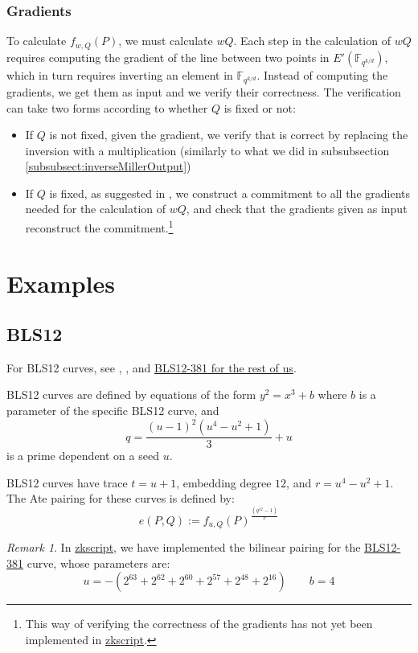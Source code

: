 \documentclass{article}
\newcommand{\fq}[1]{\mathbb{F}_{q^{#1}}}
\theoremstyle{remark}
\newtheorem{remark}{Remark}[section]
\theoremstyle{plain}
\begin{document}
\subsubsection{Gradients}

To calculate $f_{w,Q}(P)$, we must calculate $w Q$.
Each step in the calculation of $wQ$ requires computing the gradient of the line between two points in $E'(\fq{k/d})$, which in turn requires inverting an element in $\fq{k/d}$.
Instead of computing the gradients, we get them as input and we verify their correctness.
The verification can take two forms according to whether $Q$ is fixed or not:
\begin{itemize}
    \item If $Q$ is not fixed, given the gradient, we verify that is correct by replacing the inversion with a multiplication (similarly to what we did in subsubsection \ref{subsubsect:inverseMillerOutput})
    \item If $Q$ is fixed, as suggested in \cite{NE-on-proving-pairings}, we construct a commitment to all the gradients needed for the calculation of $wQ$, and check that the gradients given as input reconstruct the commitment.\footnote{This way of verifying the correctness of the gradients has not yet been implemented in \href{https://github.com/nchain-innovation/zkscript_package}{zkscript}.}
\end{itemize}

\section{Examples}

\subsection{BLS12}

For BLS12 curves, see \cite{BLS-curves-with-prescribed-emb-degree}, \cite{FST-taxonomy}, and \href{https://hackmd.io/@benjaminion/bls12-381}{BLS12-381 for the rest of us}.

BLS12 curves are defined by equations of the form $y^2 = x^3 + b$ where $b$ is a parameter of the specific BLS12 curve, and
\[
    q = \frac{(u-1)^2 (u^4 - u^2 + 1)}{3} + u
\]
is a prime dependent on a seed $u$.

BLS12 curves have trace $t = u + 1$, embedding degree $12$, and $r = u^4 - u^2 + 1$.
The Ate pairing for these curves is defined by:
\[
    e(P,Q) := f_{u,Q}(P)^{\frac{(q^{12}-1)}{r}}
\]

\begin{remark}
    In \href{https://github.com/nchain-innovation/zkscript_package}{zkscript}, we have implemented the bilinear pairing for the \href{https://electriccoin.co/blog/new-snark-curve/}{BLS12-381} curve, whose parameters are:
    \[
        u = -(2^{63} + 2^{62} + 2^{60} + 2^{57} + 2^{48} + 2^{16}) \quad \quad b = 4
    \]
\end{remark}
\end{document}
